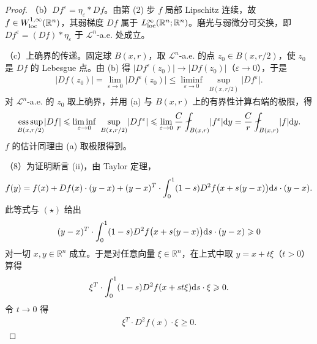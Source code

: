 \documentclass[../../main.tex]{subfiles}%
\begin{document}
\begin{proof}
（b）$Df^{\varepsilon}=\eta_{\varepsilon}*Df$。由第 (2) 步 $f$ 局部 Lipschitz 连续，故 $f\in W^{1,\infty}_{\mathrm{loc}}(\mathbb{R}^n)$，其弱梯度 $Df$ 属于 $L^{\infty}_{\mathrm{loc}}(\mathbb{R}^n;\mathbb{R}^n)$。磨光与弱微分可交换，即 $Df^{\varepsilon}=(Df)*\eta_{\varepsilon}$ 于 $\mathcal{L}^{n}$-a.e. 处成立。

（c）上确界的传递。固定球 $B(x,r)$，取 $\mathcal{L}^{n}$-a.e. 的点 $z_0\in B(x,r/2)$，使 $z_0$ 是 $Df$ 的 Lebesgue 点。由 (b) 得 $\lvert Df^{\varepsilon}(z_0)\rvert\to\lvert Df(z_0)\rvert$（$\varepsilon\to0$），于是
\begin{align*}
\lvert Df(z_0)\rvert=\lim_{\varepsilon\to0}\lvert Df^{\varepsilon}(z_0)\rvert\leqslant\liminf_{\varepsilon\to0}\ \sup_{B(x,r/2)}\lvert Df^{\varepsilon}\rvert .
\end{align*}
对 $\mathcal{L}^{n}$-a.e. 的 $z_0$ 取上确界，并用 (a) 与 $B(x,r)$ 上的有界性计算右端的极限，得
\begin{align*}
\operatorname*{ess\,sup}_{B(x,r/2)}\lvert Df\rvert
\leqslant\liminf_{\varepsilon\to0}\ \sup_{B(x,r/2)}\lvert Df^{\varepsilon}\rvert
\leqslant\lim_{\varepsilon\to0}\frac Cr\fint_{B(x,r)}\lvert f^{\varepsilon}\rvert\diff y
=\frac Cr\fint_{B(x,r)}\lvert f\rvert\diff y .
\end{align*}
$f$ 的估计同理由 (a) 取极限得到。

（8）为证明断言 (ii)，由 Taylor 定理，
\begin{align*}
f(y)=f(x)+Df(x)\cdot(y-x)+(y-x)^{T}\cdot\int_0^1(1-s)D^{2}f\bigl(x+s(y-x)\bigr)\mathrm{d} s\cdot(y-x).
\end{align*}
此等式与 $(\star)$ 给出
\begin{align*}
(y-x)^{T}\cdot\int_0^1(1-s)D^{2}f\bigl(x+s(y-x)\bigr)\mathrm{d} s\cdot(y-x)\geqslant0
\end{align*}
对一切 $x,y\in\mathbb{R}^n$ 成立。于是对任意向量 $\xi\in\mathbb{R}^n$，在上式中取 $y=x+t\xi$（$t>0$）算得
\begin{align*}
\xi^{T}\cdot\int_0^1(1-s)D^{2}f(x+st\xi)\mathrm{d} s\cdot\xi\geqslant0 .
\end{align*}
令 $t\to0$ 得
\begin{align*}
\xi^{T}\cdot D^{2}f(x)\cdot\xi\geqslant0 .
\end{align*}
\end{proof}
\end{document}

